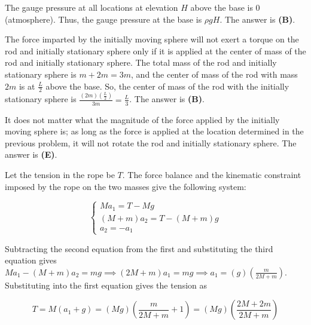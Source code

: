 \documentclass[12pt]{article}
\begin{document}
\vspace{2 \baselineskip}



The gauge pressure at all locations at elevation $H$ above the base is $0$ (atmosphere). Thus, the gauge pressure at the base is $\rho g H$. The answer is \textbf{(B)}.


\vspace{2 \baselineskip}



The force imparted by the initially moving sphere will not exert a torque on the rod and initially stationary sphere only if it is applied at the center of mass of the rod and initially stationary sphere. The total mass of the rod and initially stationary sphere is $m + 2 m = 3 m$, and the center of mass of the rod with mass $2 m$ is at $\frac{L}{2}$ above the base. So, the center of mass of the rod with the initially stationary sphere is $\frac{(2 m) \left( \frac{L}{2} \right)}{3 m} = \frac{L}{3}$. The answer is \textbf{(B)}.


\vspace{2 \baselineskip}



It does not matter what the magnitude of the force applied by the initially moving sphere is; as long as the force is applied at the location determined in the previous problem, it will not rotate the rod and initially stationary sphere. The answer is \textbf{(E)}.


\vspace{2 \baselineskip}



Let the tension in the rope be $T$. The force balance and the kinematic constraint imposed by the rope on the two masses give the following system:

$$\begin{cases}
M a_1 = T - M g \\
(M + m) a_2 = T - (M + m) g \\
a_2 = -a_1
\end{cases}$$

Subtracting the second equation from the first and substituting the third equation gives $M a_1 - (M + m) a_2 = m g \implies (2 M + m) a_1 = m g \implies a_1 = (g) \left( \frac{m}{2 M + m} \right)$. Substituting into the first equation gives the tension as

$$T = M (a_1 + g) = (M g) \left( \frac{m}{2 M + m} + 1 \right) = (M g) \left( \frac{2 M + 2 m}{2 M + m} \right)$$
\end{document}
